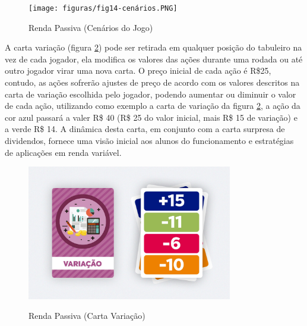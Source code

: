\graphicspath{{figuras/}}
\begin{figure}[!ht]
\centering
\begin{minipage}{0.8\textwidth}
\caption{Renda Passiva (Cenários do Jogo)}
\centering
\texttt{[image: figuras/fig14-cenários.PNG]}
\label{fig: fig14-cenários}
\end{minipage}
\end{figure}

A carta variação (figura \ref{fig: fig15-carta-variação}) pode ser retirada em qualquer posição do tabuleiro na vez de cada jogador, ela modifica os valores das ações durante uma rodada ou até outro jogador virar uma nova carta. O preço inicial de cada ação é R\$25, contudo, as ações sofrerão ajustes de preço de acordo com os valores descritos na carta de variação escolhida pelo jogador, podendo aumentar ou diminuir o valor de cada ação, utilizando como exemplo a carta de variação da figura \ref{fig: fig15-carta-variação}, a ação da cor azul passará a valer R\$ 40 (R\$ 25 do valor inicial, mais R\$ 15 de variação) e a verde R\$ 14. A dinâmica desta carta, em conjunto com a carta surpresa de dividendos, fornece uma visão inicial aos alunos do funcionamento e estratégias de aplicações em renda variável.

\graphicspath{{figuras/}}
\begin{figure}[!ht]
\centering
\begin{minipage}{0.8\textwidth}
\caption{Renda Passiva (Carta Variação)}
\centering
\includegraphics[width=0.8\textwidth]{figuras/fig15-carta-variação.jpg}
\label{fig: fig15-carta-variação}
\end{minipage}
\end{figure}

